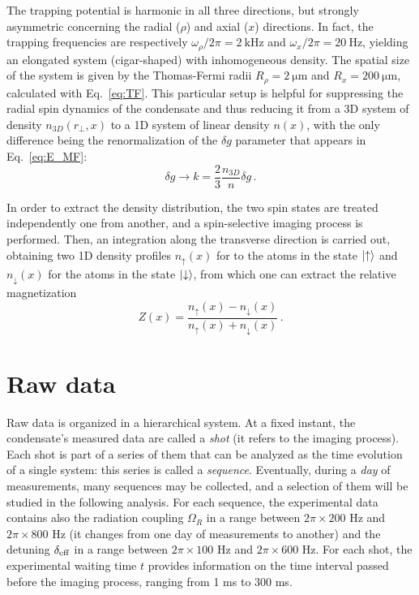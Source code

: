 The trapping potential is harmonic in all three directions, but strongly asymmetric concerning the radial ($\rho$) and axial ($x$) directions. In fact, the trapping frequencies are respectively $\omega_\rho/2\pi = 2\ \unit{\kilo\hertz}$ and $\omega_x/2\pi = 20\ \unit{\hertz}$, yielding an elongated system (cigar-shaped) with inhomogeneous density. The spatial size of the system is given by the Thomas-Fermi radii $R_\rho = 2\ \unit{\micro\meter}$ and $R_x = 200\ \unit{\micro\meter}$, calculated with Eq.\ \eqref{eq:TF}. This particular setup is helpful for suppressing the radial spin dynamics of the condensate and thus reducing it from a 3D system of density $n_{3D}(r_\perp,x)$ to a 1D system of linear density $n(x)$, with the only difference being the renormalization of the $\delta g$ parameter that appears in Eq.\ \eqref{eq:E_MF}:
\[
    \delta g \to k = \frac{2}{3}\frac{n_{3D}}{n}\delta g\, .
\]

In order to extract the density distribution, the two spin states are treated independently one from another, and a spin-selective imaging process is performed. Then, an integration along the transverse direction is carried out, obtaining two 1D density profiles $n_\uparrow(x)$ for to the atoms in the state $\ket{\uparrow}$ and $n_\downarrow(x)$ for the atoms in the state $\ket{\downarrow}$, from which one can extract the relative magnetization
\begin{equation}
    Z(x) = \frac{n_\uparrow(x) - n_\downarrow(x)}{n_\uparrow(x) + n_\downarrow(x)}\, .
    \label{eq:magnetization}
\end{equation}

\section{Raw data}
Raw data is organized in a hierarchical system. At a fixed instant, the condensate's measured data are called a \textit{shot} (it refers to the imaging process). Each shot is part of a series of them that can be analyzed as the time evolution of a single system: this series is called a \textit{sequence}. Eventually, during a \textit{day} of measurements, many sequences may be collected, and a selection of them will be studied in the following analysis. For each sequence, the experimental data contains also the radiation coupling $\Omega_R$ in a range between $2\pi \times 200$ \unit{\hertz} and $2\pi \times 800$ \unit{\hertz} (it changes from one day of measurements to another) and the detuning $\delta_{\rm eff}$ in a range between $2\pi \times 100$ \unit{\hertz} and $2\pi \times 600$ \unit{\hertz}. For each shot, the experimental waiting time $t$ provides information on the time interval passed before the imaging process, ranging from 1 \unit{\milli\second} to 300 \unit{\milli\second}. 

